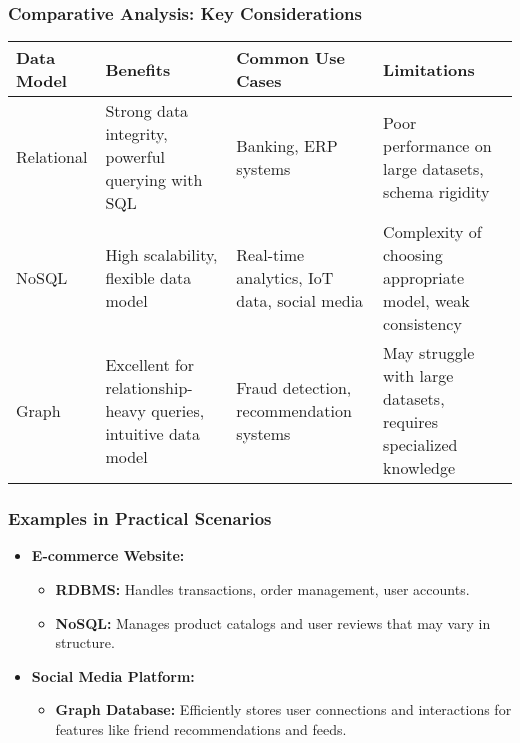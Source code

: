 \documentclass[aspectratio=169]{beamer}
\begin{document}
\begin{frame}[fragile]
    \frametitle{Comparative Analysis: Key Considerations}
    \begin{center}
        \begin{tabular}{|l|l|l|l|}
            \hline
            \textbf{Data Model} & \textbf{Benefits} & \textbf{Common Use Cases} & \textbf{Limitations} \\ \hline
            Relational       & Strong data integrity, powerful querying with SQL & Banking, ERP systems & Poor performance on large datasets, schema rigidity \\ \hline
            NoSQL            & High scalability, flexible data model & Real-time analytics, IoT data, social media & Complexity of choosing appropriate model, weak consistency \\ \hline
            Graph            & Excellent for relationship-heavy queries, intuitive data model & Fraud detection, recommendation systems & May struggle with large datasets, requires specialized knowledge \\ \hline
        \end{tabular}
    \end{center}
\end{frame}

\begin{frame}[fragile]
    \frametitle{Examples in Practical Scenarios}
    \begin{itemize}
        \item \textbf{E-commerce Website:}
            \begin{itemize}
                \item \textbf{RDBMS:} Handles transactions, order management, user accounts.
                \item \textbf{NoSQL:} Manages product catalogs and user reviews that may vary in structure.
            \end{itemize}
        
        \item \textbf{Social Media Platform:}
            \begin{itemize}
                \item \textbf{Graph Database:} Efficiently stores user connections and interactions for features like friend recommendations and feeds.
            \end{itemize}
    \end{itemize}
\end{frame}
\end{document}
